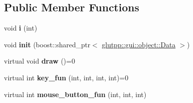 \subsection*{\-Public \-Member \-Functions}
\begin{DoxyCompactItemize}
\item 
\hypertarget{classglutpp_1_1gui_1_1object_1_1object_a006afaeceb89f8feb38bdadee1de8ab6}{void {\bfseries i} (int)}\label{classglutpp_1_1gui_1_1object_1_1object_a006afaeceb89f8feb38bdadee1de8ab6}

\item 
\hypertarget{classglutpp_1_1gui_1_1object_1_1object_a3cc45cb2de4441451e7c5adc0bc4d1a9}{void {\bfseries init} (boost\-::shared\-\_\-ptr$<$ \hyperlink{classglutpp_1_1gui_1_1object_1_1Data}{glutpp\-::gui\-::object\-::\-Data} $>$)}\label{classglutpp_1_1gui_1_1object_1_1object_a3cc45cb2de4441451e7c5adc0bc4d1a9}

\item 
\hypertarget{classglutpp_1_1gui_1_1object_1_1object_aa444e18e9d861c9dc3303a7baefaff25}{virtual void {\bfseries draw} ()=0}\label{classglutpp_1_1gui_1_1object_1_1object_aa444e18e9d861c9dc3303a7baefaff25}

\item 
\hypertarget{classglutpp_1_1gui_1_1object_1_1object_a63569b7bbd67ffe91fa48ce08288c388}{virtual int {\bfseries key\-\_\-fun} (int, int, int, int)=0}\label{classglutpp_1_1gui_1_1object_1_1object_a63569b7bbd67ffe91fa48ce08288c388}

\item 
\hypertarget{classglutpp_1_1gui_1_1object_1_1object_a9fe2709890ef4285fbfebec5b117eb6f}{virtual int {\bfseries mouse\-\_\-button\-\_\-fun} (int, int, int)}\label{classglutpp_1_1gui_1_1object_1_1object_a9fe2709890ef4285fbfebec5b117eb6f}

\end{DoxyCompactItemize}

